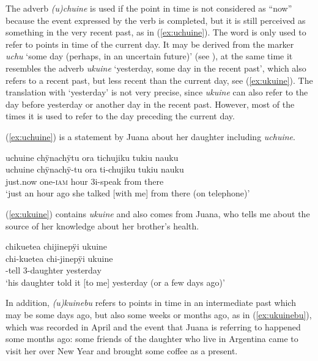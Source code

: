 The adverb \textit{(u)chuine} is used if the point in time is not considered as “now” because the event expressed by the verb is completed, but it is still perceived as something in the very recent past, as in (\ref{ex:uchuine}). The word is only used to refer to points in time of the current day. It may be derived from the  marker \textit{uchu} ‘some day (perhaps, in an uncertain future)’ (see ), at the same time it resembles the adverb \textit{ukuine} ‘yesterday, some day in the recent past’, which also refers to a recent past, but less recent than the current day, see (\ref{ex:ukuine}). The translation with ‘yesterday’ is not very precise, since \textit{ukuine} can also refer to the day before yesterday or another day in the recent past. However, most of the times it is used to refer to the day preceding the current day.

(\ref{ex:uchuine}) is a statement by Juana about her daughter including \textit{uchuine}.

\ea\label{ex:uchuine}
\begingl
\glpreamble uchuine chÿnachÿtu ora tichujiku tukiu nauku\\
\gla uchuine chÿnachÿ-tu ora ti-chujiku tukiu nauku\\
\glb just.now one-\textsc{iam} hour 3i-speak from there\\
\glft ‘just an hour ago she talked [with me] from there (on telephone)’
\endgl
\trailingcitation{[jxx-p120430l-1.335-336]}
\xe

(\ref{ex:ukuine}) contains \textit{ukuine} and also comes from Juana, who tells me about the source of her knowledge about her brother’s health.

\ea\label{ex:ukuine}
\begingl
\glpreamble chikuetea chijinepÿi ukuine\\
\gla chi-kuetea chi-jinepÿi ukuine\\
-tell 3-daughter yesterday\\
\glft ‘his daughter told it [to me] yesterday (or a few days ago)’
\endgl
\trailingcitation{[jxx-e150925l-1.124]}
\xe

In addition, \textit{(u)kuinebu} refers to points in time in an intermediate past which may be some days ago, but also some weeks or months ago, as in (\ref{ex:ukuinebu}), which was recorded in April and the event that Juana is referring to happened some months ago: some friends of the daughter who live in Argentina came to visit her over New Year and brought some coffee as a present.

